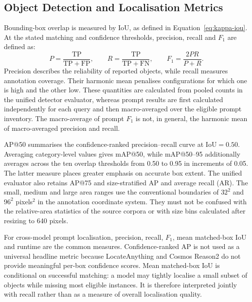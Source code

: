 \subsection{Object Detection and Localisation Metrics}
\label{sec:ev-detection-metrics}
Bounding-box overlap is measured by \gls{IoU}, as defined in Equation~\ref{eq:kappa-iou}. At the stated matching and confidence thresholds, precision, recall and \(F_1\) are defined as:
\begin{equation}
\label{eq:ev-prf}
P=\frac{\mathrm{TP}}{\mathrm{TP}+\mathrm{FP}},\qquad
R=\frac{\mathrm{TP}}{\mathrm{TP}+\mathrm{FN}},\qquad
F_1=\frac{2PR}{P+R}.
\end{equation}
\noindent Precision describes the reliability of reported objects, while recall measures annotation coverage. Their harmonic mean penalises configurations for which one is high and the other low. These quantities are calculated from pooled counts in the unified detector evaluator, whereas prompt results are first calculated independently for each query and then macro-averaged over the eligible prompt inventory. The macro-average of prompt \(F_1\) is not, in general, the harmonic mean of macro-averaged precision and recall.

\gls{AP}@50 summarises the confidence-ranked precision--recall curve at \(\mathrm{IoU}=0.50\). Averaging category-level values gives \gls{mAP}@50, while \gls{mAP}@50--95 additionally averages across the ten overlap thresholds from 0.50 to 0.95 in increments of 0.05. The latter measure places greater emphasis on accurate box extent. The unified evaluator also retains \gls{AP}@75 and size-stratified \gls{AP} and average recall (AR). The small, medium and large area ranges use the conventional boundaries of \(32^2\) and \(96^2\) pixels$^2$ in the annotation coordinate system. They must not be confused with the relative-area statistics of the source corpora or with size bins calculated after resizing to 640 pixels.

For cross-model prompt localisation, precision, recall, \(F_1\), mean matched-box \gls{IoU} and runtime are the common measures. Confidence-ranked \gls{AP} is not used as a universal headline metric because LocateAnything and Cosmos Reason2 do not provide meaningful per-box confidence scores. Mean matched-box \gls{IoU} is conditional on successful matching: a model may tightly localise a small subset of objects while missing most eligible instances. It is therefore interpreted jointly with recall rather than as a measure of overall localisation quality.

